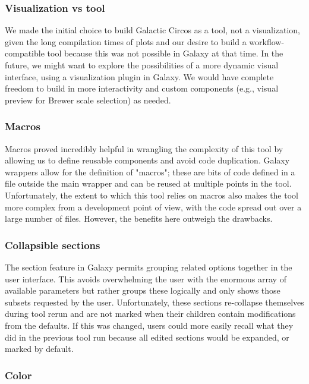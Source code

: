 \subsubsection*{Visualization vs tool}

We made the initial choice to build Galactic Circos as a tool, not a visualization, given the long compilation times of plots and our desire to build a workflow-compatible tool because this was not possible in Galaxy at that time.
In the future, we might want to explore the possibilities of a more dynamic visual interface, using a visualization plugin in Galaxy. We would have complete freedom to build in more interactivity and custom components (e.g., visual preview for Brewer scale selection) as needed.

\subsubsection*{Macros}

Macros proved incredibly helpful in wrangling the complexity of this tool by allowing us to define reusable components and avoid code duplication. Galaxy wrappers allow for the definition of "macros"; these are bits of code defined in a file outside the main wrapper and can be reused at multiple points in the tool. Unfortunately, the extent to which this tool relies on macros also makes the tool more complex from a development point of view, with the code spread out over a large number of files. However, the benefits here outweigh the drawbacks.

\subsubsection*{Collapsible sections}

The section feature in Galaxy permits grouping related options together in the user interface. This avoids overwhelming the user with the enormous array of available parameters but rather groups these logically and only shows those subsets requested by the user. Unfortunately, these sections re-collapse themselves during tool rerun and are not marked when their children contain modifications from the defaults. If this was changed, users could more easily recall what they did in the previous tool run because all edited sections would be expanded, or marked by default.

\subsubsection*{Color}

